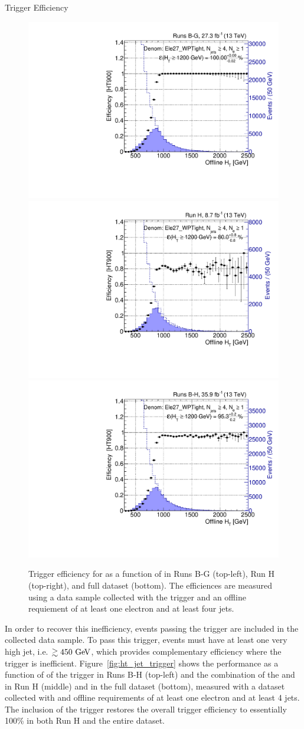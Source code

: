 \begin{section}{Trigger Efficiency}
\begin{figure}[tbp!]
\centering
\includegraphics[angle=0,width=0.45\columnwidth]{fig/trig_ht_runsbg.pdf}
\includegraphics[angle=0,width=0.45\columnwidth]{fig/trig_ht_runh.pdf}
\includegraphics[angle=0,width=0.45\columnwidth]{fig/trig_ht_runsbh.pdf}
\caption{Trigger efficiency for \trigHT as a function of \HT in Runs B-G (top-left), Run H (top-right), and full dataset (bottom). 
The efficiences are measured using a data sample collected with the \trigEle trigger and an offline requiement of at least one electron and at least four jets.}
\label{fig:ht_trigger}
\end{figure}

In order to recover this inefficiency, events passing the \trigJet trigger are included in the collected data sample.
To pass this trigger, events must have at least one very high \pT jet, i.e. $\gtrsim 450~\mathrm{Ge\kern -0.1em V}$, which provides complementary efficiency where the \trigHT trigger is inefficient.
Figure~\ref{fig:ht_jet_trigger} shows the performance as a function of \HT of the \trigJet trigger in Runs B-H (top-left) and the combination of the \trigHT and \trigJet in Run H (middle) and in the full dataset (bottom), measured with a dataset collected with \trigEle and offline requirements of at least one electron and at least 4 jets.
The inclusion of the \trigJet trigger restores the overall trigger efficiency to essentially 100\% in both Run H and the entire dataset.


\end{section}
